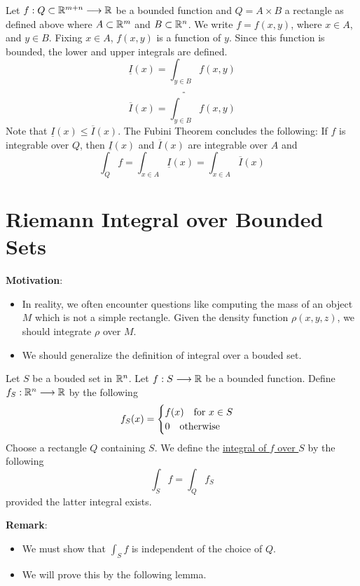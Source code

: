 \begin{theorem}
    Let $f : Q\subset\mathbb{R}^{m+n} \longrightarrow \mathbb{R}$ be a bounded function and $Q = A \times B$ a rectangle as defined above where $A\subset\mathbb{R}^m$ and $B\subset \mathbb{R}^n$.
    We write $f = f(x,y)$, where $x \in A$, and $y \in B$. Fixing $x \in A$, $f(x,y)$ is a function of $y$. Since this function is bounded, the lower and upper integrals are defined.
    $$\underline{I}(x)=\underline{\int_{y\in B}}f(x,y)$$
    $$\overline{I}(x)=\overline{\int_{y\in B}}f(x,y)$$
    Note that $\underline{I}(x) \leq \overline{I}(x)$. The Fubini Theorem concludes the following: If $f$ is integrable over $Q$, then $\underline{I}(x)$ and $\overline{I}(x)$ are integrable over $A$ and
    $$\int_Qf=\int_{x\in A}\underline{I}(x)=\int_{x\in A}\overline{I}(x)$$
\end{theorem}

\section{Riemann Integral over Bounded Sets}

\noindent \textbf{Motivation}:
\begin{itemize}
    \item In reality, we often encounter questions like computing the mass of an object $M$ which is not a simple rectangle. Given the density function $\rho(x,y,z)$, we should integrate $\rho$ over $M$.
    \item We should generalize the definition of integral over a bouded set.
\end{itemize}

\begin{definition}
    Let $S$ be a bouded set in $\mathbb{R}^n$. Let $f:S\longrightarrow \mathbb{R}$ be a bounded function. Define $f_S:\mathbb{R}^n\longrightarrow\mathbb{R}$ by the following
    \begin{equation}
        f_S(x)=
        \begin{cases}
            f(x)\text{\quad for } x\in S\\
            0\text{\quad otherwise}
        \end{cases}
    \end{equation}
    Choose a rectangle $Q$ containing $S$. We define the \underline{integral of $f$ over $S$} by the following
    \begin{equation}
        \int_Sf=\int_Qf_S
    \end{equation}
    provided the latter integral exists.
\end{definition}
\noindent \textbf{Remark}:
\begin{itemize}
    \item We must show that $\int_Sf$ is independent of the choice of $Q$.
    \item We will prove this by the following lemma.
\end{itemize}


